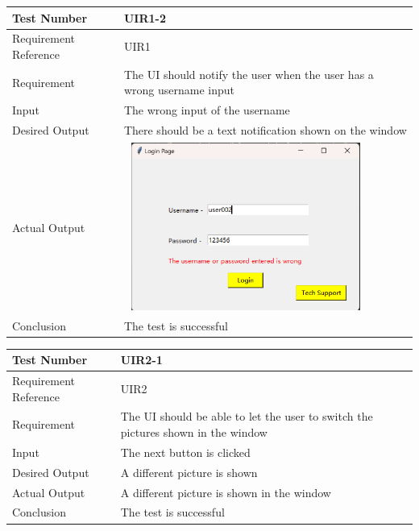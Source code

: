 \documentclass[12pt, titlepage]{article}
\begin{document}
\begin{table}[H]
\begin{center}
\begin{tabular}{|l | m{9cm}|}
\hline
  Test Number & UIR1-2\\
  \hline
  Requirement Reference & UIR1\\
  \hline
  Requirement & The UI should notify the user when the user has a wrong username input \\
  \hline
  Input & The wrong input of the username\\
  \hline
  Desired Output & There should be a text notification shown on the window\\
  \hline
  Actual Output & \includegraphics[width=80mm, height=55mm]{UIR12.png}\\
  \hline
  Conclusion & The test is successful\\
  \hline
\end{tabular}
\end{center}           
\end{table}

\begin{table}[H]
\begin{center}
\begin{tabular}{|l | m{9cm}|}
\hline
  Test Number & UIR2-1\\
  \hline
  Requirement Reference & UIR2\\
  \hline
  Requirement & The UI should be able to let the user to switch the pictures shown in the window \\
  \hline
  Input & The next button is clicked\\
  \hline
  Desired Output & A different picture is shown\\
  \hline
  Actual Output & A different picture is shown in the window\\
  \hline
  Conclusion & The test is successful\\
  \hline
\end{tabular}
\end{center}           
\end{table}
\end{document}
